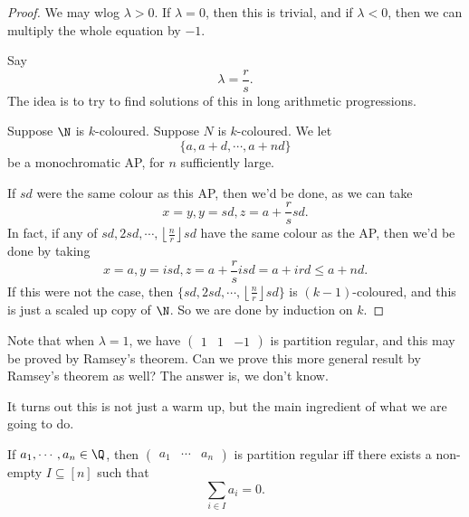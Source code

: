 \documentclass[a4paper]{article}
\begin{document}
\begin{proof}
  We may wlog $\lambda > 0$. If $\lambda = 0$, then this is trivial, and if $\lambda < 0$, then we can multiply the whole equation by $-1$.

  Say
  \[
    \lambda = \frac{r}{s}.
  \]
  The idea is to try to find solutions of this in long arithmetic progressions.

  Suppose $\N$ is $k$-coloured. Suppose $N$ is $k$-coloured. We let
  \[
    \{a, a + d, \cdots, a + nd\}
  \]
  be a monochromatic AP, for $n$ sufficiently large.

  If $sd$ were the same colour as this AP, then we'd be done, as we can take
  \[
    x = y, y = sd, z = a + \frac{r}{s} sd.
  \]
  In fact, if any of $sd, 2sd, \cdots, \left\lfloor\frac{n}{r}\right\rfloor sd$ have the same colour as the AP, then we'd be done by taking
  \[
    x = a, y = isd, z = a + \frac{r}{s} isd = a + ird \leq a + nd.
  \]
  If this were not the case, then $\{sd, 2sd, \cdots, \left\lfloor\frac{n}{r}\right\rfloor sd\}$ is $(k - 1)$-coloured, and this is just a scaled up copy of $\N$. So we are done by induction on $k$.
\end{proof}

Note that when $\lambda = 1$, we have $\begin{pmatrix}1 & 1 & -1\end{pmatrix}$ is partition regular, and this may be proved by Ramsey's theorem. Can we prove this more general result by Ramsey's theorem as well? The answer is, we don't know.

It turns out this is not just a warm up, but the main ingredient of what we are going to do.

\begin{thm}
  If $a_1,\cdots, a_n \in \Q$, then $\begin{pmatrix} a_1 & \cdots & a_n \end{pmatrix}$ is partition regular iff there exists a non-empty $I \subseteq [n]$ such that
  \[
    \sum_{i \in I} a_i = 0.
  \]
\end{thm}
\end{document}
